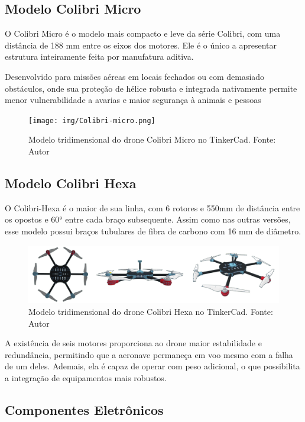 \documentclass[conference]{IEEEtran}
\begin{document}
\subsection{Modelo Colibri Micro}

O Colibri Micro é o modelo mais compacto e leve da série Colibri, com uma distância de 188 mm entre os eixos dos motores. Ele é o único a apresentar estrutura inteiramente feita por manufatura aditiva.

Desenvolvido para missões aéreas em locais fechados ou com demasiado obstáculos, onde sua proteção de hélice robusta e integrada nativamente permite menor vulnerabilidade a avarias e maior segurança à animais e pessoas

\begin{figure}[!htb]
    \centering
    \texttt{[image: img/Colibri-micro.png]} 
    \caption{Modelo tridimensional do drone Colibri Micro no TinkerCad. Fonte: Autor}
    \label{fig:my_label}
\end{figure}

\subsection{Modelo Colibri Hexa}
O Colibri-Hexa é o maior de sua linha, com 6 rotores e 550mm de distância entre os opostos e 60° entre cada braço subsequente. Assim como nas outras versões, esse modelo possui braços tubulares de fibra de carbono com 16 mm de diâmetro.

\begin{figure}[!htb]
    \centering
    \includegraphics[scale=0.14]{img/Colibri-hexa.png} 
    \caption{Modelo tridimensional do drone Colibri Hexa no TinkerCad. Fonte: Autor}
    \label{fig:my_label}
\end{figure}

A existência de seis motores proporciona ao drone maior estabilidade e redundância, permitindo que a aeronave permaneça em voo mesmo com a falha de um deles. Ademais, ela é capaz de operar com peso adicional, o que possibilita a integração de equipamentos mais robustos.

\subsection{Componentes Eletrônicos}
\end{document}
